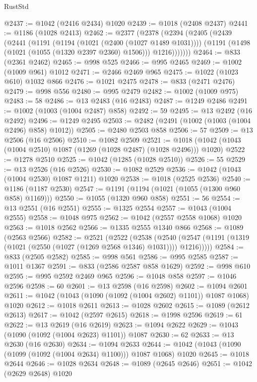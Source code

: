 \begin{lexlean}{RustStd}
\begin{coremodule}
@2437 := @1042 (@2416 @2434) @1020
@2439 := @1018 (@2408 @2437)
@2441 := @1186 (@1028 @2413)
@2462 := @2377
    (@2378
      (@2394
        (@2405
          (@2439
            (@2441
              (@1191
                (@1194 (@1021 (@2400 (@1027 @1489 @1031))))
                (@1191 (@1498 (@1021 (@1055 (@1320 @2397 @2360) @1506))) @1216)))))))
@2464 := @833 (@2361 @2462)
@2465 := @998 @525
@2466 := @995 @2465
@2469 := @1002 (@1009 @961) @1012
@2471 := @2466 @2469 @965
@2475 := @1022 (@1023 @610) @1032 @866
@2476 := @1021 @2475
@2478 := @833 (@2471 @2476)
@2479 := @998 @556
@2480 := @995 @2479
@2482 := @1002 (@1009 @975)
@2483 := 58
@2486 := @13 @2483 (@16 @2483)
@2487 := @1249 @2486
@2491 := @1002 (@1003 (@1004 @2487) @858)
@2492 := 59
@2495 := @13 @2492 (@16 @2492)
@2496 := @1249 @2495
@2503 := @2482 (@2491 (@1002 (@1003 (@1004 @2496) @858) @1012))
@2505 := @2480 @2503 @858
@2506 := 57
@2509 := @13 @2506 (@16 @2506)
@2510 := @1082 @2509
@2521 := @1018 (@1042 (@1043 (@1004 @2510) @1087 (@1269 (@1028 @2487) (@1028 @2496))) @1020)
@2522 := @1278 @2510
@2525 := @1042 (@1285 (@1028 @2510))
@2526 := 55
@2529 := @13 @2526 (@16 @2526)
@2530 := @1082 @2529
@2536 := @1042 (@1043 (@1004 @2530) @1087 @1211) @1020
@2538 := @1018 (@2525 @2536)
@2540 := @1186 (@1187 @2530)
@2547 := @1191 (@1194 (@1021 (@1055 (@1300 @960 @858) @1169)))
@2550 := @1055 (@1320 @960 @858)
@2551 := 56
@2554 := @13 @2551 (@16 @2551)
@2555 := @1325 @2554
@2557 := @1043 (@1004 @2555)
@2558 := @1048 @975
@2562 := @1042 (@2557 @2558 @1068) @1020
@2563 := @1018 @2562
@2566 := @1335 @2555 @1340 @866
@2568 := @1089 (@2563 @2566)
@2582 := @2521
    (@2522
      (@2538
        (@2540 (@2547 (@1191 (@1319 (@1021 (@2550 (@1027 (@1269 @2568 @1346) @1031)))) @1216)))))
@2584 := @833 (@2505 @2582)
@2585 := @998 @561
@2586 := @995 @2585
@2587 := @1011 @1367
@2591 := @833 (@2586 @2587 @858 @1629)
@2592 := @998 @610
@2595 := @995 @2592 @2469 @965
@2596 := @1048 @858
@2597 := @1046 @2596
@2598 := 60
@2601 := @13 @2598 (@16 @2598)
@2602 := @1094 @2601
@2611 := @1042 (@1043 (@1090 (@1092 (@1004 @2602) @1101)) @1087 @1068) @1020
@2612 := @1018 @2611
@2613 := @1028 @2602
@2615 := @1089 (@2612 @2613)
@2617 := @1042 (@2597 @2615)
@2618 := @1998 @2596
@2619 := 61
@2622 := @13 @2619 (@16 @2619)
@2623 := @1094 @2622
@2629 := @1043 (@1090 (@1092 (@1004 @2623) @1101)) @1087
@2630 := 62
@2633 := @13 @2630 (@16 @2630)
@2634 := @1094 @2633
@2644 := @1042 (@1043 (@1090 (@1099 (@1092 (@1004 @2634) @1100))) @1087 @1068) @1020
@2645 := @1018 @2644
@2646 := @1028 @2634
@2648 := @1089 (@2645 @2646)
@2651 := @1042 (@2629 @2648) @1020

\end{coremodule}
\end{lexlean}

